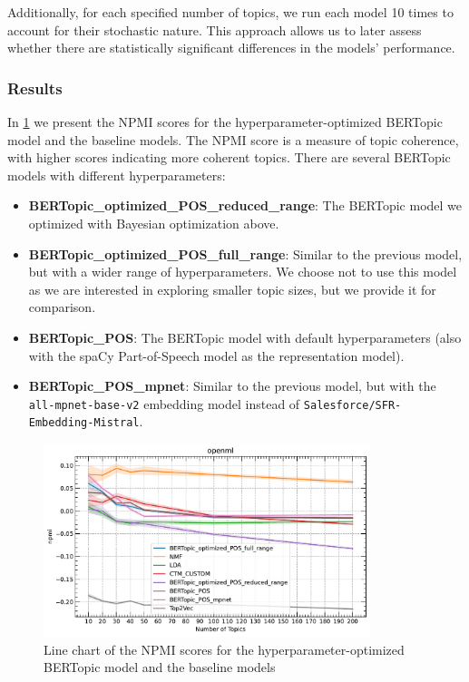 Additionally, for each specified number of topics, we run each model 10 times to account for their stochastic nature. This approach allows us to later assess whether there are statistically significant differences in the models' performance.

\subsubsection{Results}
In \cref{fig:openml_npmi} we present the NPMI scores for the hyperparameter-optimized BERTopic model and the baseline models. The NPMI score is a measure of topic coherence, with higher scores indicating more coherent topics. There are several BERTopic models with different hyperparameters:
\begin{itemize}
    \item \textbf{BERTopic\_optimized\_POS\_reduced\_range}: The BERTopic model we optimized with Bayesian optimization above.
    \item \textbf{BERTopic\_optimized\_POS\_full\_range}: Similar to the previous model, but with a wider range of hyperparameters. We choose not to use this model as we are interested in exploring smaller topic sizes, but we provide it for comparison.
    \item \textbf{BERTopic\_POS}: The BERTopic model with default hyperparameters (also with the spaCy Part-of-Speech model as the representation model).
    \item \textbf{BERTopic\_POS\_mpnet}: Similar to the previous model, but with the \texttt{all-mpnet-base-v2} embedding model instead of \texttt{Salesforce/SFR-Embedding-Mistral}.
\end{itemize}

\begin{figure}[h]
    \centering
    \includegraphics[width=0.85\textwidth]{figures/openml_npmi.pdf}
    \caption{Line chart of the NPMI scores for the hyperparameter-optimized BERTopic model and the baseline models}
    \label{fig:openml_npmi}
\end{figure}

